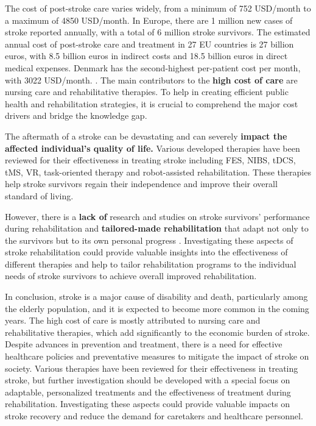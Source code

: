 The cost of post-stroke care varies widely, from a minimum of 752 USD/month to a maximum of 4850 USD/month. In Europe, there are 1 million new cases of stroke reported annually, with a total of 6 million stroke survivors. The estimated annual cost of post-stroke care and treatment in 27 EU countries is 27 billion euros, with 8.5 billion euros in indirect costs and 18.5 billion euros in direct medical expenses. Denmark has the second-highest per-patient cost per month, with 3022 USD/month. \cite{Rochmah2021}.  The main contributors to the \textbf{high cost of care} are nursing care and rehabilitative therapies. To help in creating efficient public health and rehabilitation strategies, it is crucial to comprehend the major cost drivers and bridge the knowledge gap. 

The aftermath of a stroke can be devastating and can severely \textbf{impact the affected individual's quality of life.} Various developed therapies have been reviewed for their effectiveness in treating stroke including FES, \ac{NIBS}, \ac{tDCS}, \ac{tMS}, \ac{VR}, task-oriented therapy and robot-assisted rehabilitation. These therapies help stroke survivors regain their independence and improve their overall standard of living.

However, there is a \textbf{lack of} research and studies on stroke survivors' performance during rehabilitation and \textbf{tailored-made rehabilitation} that adapt not only to the survivors but to its own personal progress \cite{Ismail2018}. Investigating these aspects of stroke rehabilitation could provide valuable insights into the effectiveness of different therapies and help to tailor rehabilitation programs to the individual needs of stroke survivors to achieve overall improved rehabilitation.

In conclusion, stroke is a major cause of disability and death, particularly among the elderly population, and it is expected to become more common in the coming years. The high cost of care is mostly attributed to nursing care and rehabilitative therapies, which add significantly to the economic burden of stroke. Despite advances in prevention and treatment, there is a need for effective healthcare policies and preventative measures to mitigate the impact of stroke on society. Various therapies have been reviewed for their effectiveness in treating stroke, but further investigation should be developed with a special focus on adaptable, personalized treatments and the effectiveness of treatment during rehabilitation. Investigating these aspects could provide valuable impacts on stroke recovery and reduce the demand for caretakers and healthcare personnel. 

